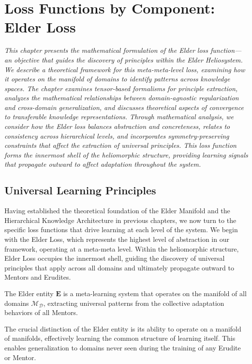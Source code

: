\chapter{Loss Functions by Component: Elder Loss}

\textit{This chapter presents the mathematical formulation of the Elder loss function—an objective that guides the discovery of principles within the Elder Heliosystem. We describe a theoretical framework for this meta-meta-level loss, examining how it operates on the manifold of domains to identify patterns across knowledge spaces. The chapter examines tensor-based formalisms for principle extraction, analyzes the mathematical relationships between domain-agnostic regularization and cross-domain generalization, and discusses theoretical aspects of convergence to transferable knowledge representations. Through mathematical analysis, we consider how the Elder loss balances abstraction and concreteness, relates to consistency across hierarchical levels, and incorporates symmetry-preserving constraints that affect the extraction of universal principles. This loss function forms the innermost shell of the heliomorphic structure, providing learning signals that propagate outward to affect adaptation throughout the system.}

\section{Universal Learning Principles}

Having established the theoretical foundation of the Elder Manifold and the Hierarchical Knowledge Architecture in previous chapters, we now turn to the specific loss functions that drive learning at each level of the system. We begin with the Elder Loss, which represents the highest level of abstraction in our framework, operating at a meta-meta level. Within the heliomorphic structure, Elder Loss occupies the innermost shell, guiding the discovery of universal principles that apply across all domains and ultimately propagate outward to Mentors and Erudites.

\begin{definition}
The Elder entity $\textbf{E}$ is a meta-learning system that operates on the manifold of all domains $\mathcal{M}_{\mathcal{D}}$, extracting universal patterns from the collective adaptation behaviors of all Mentors.
\end{definition}

The crucial distinction of the Elder entity is its ability to operate on a manifold of manifolds, effectively learning the common structure of learning itself. This enables generalization to domains never seen during the training of any Erudite or Mentor.

